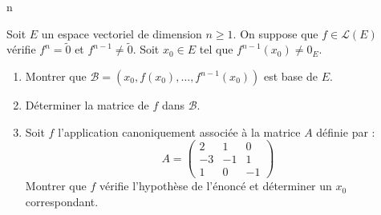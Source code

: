 n\documentclass[a4paper,10pt]{report}
\begin{document}
\begin{Exa} Soit $E$ un espace vectoriel de dimension $n \geq 1$. On suppose que $f \in \mathcal{L}(E)$ vérifie $f^n = \tilde{0}$ et $f^{n-1} \neq \tilde{0}$. Soit $x_0 \in E$ tel que $f^{n-1}(x_0) \neq 0_E$.

\begin{enumerate}
\item Montrer que $\mathcal{B}= (x_0, f(x_0), \ldots, f^{n-1}(x_0))$ est base de $E$. 
\item Déterminer la matrice de $f$ dans $\mathcal{B}$.
\item Soit $f$ l'application canoniquement associée à la matrice $A$ définie par :
$$ A = \begin{pmatrix}
2 & 1 & 0 \\
-3 & -1 & 1 \\
1 & 0 & -1 
\end{pmatrix}$$
Montrer que $f$ vérifie l'hypothèse de l'énoncé et déterminer un $x_0$ correspondant.
\end{enumerate}
\end{Exa}

\corr 
\end{document}
